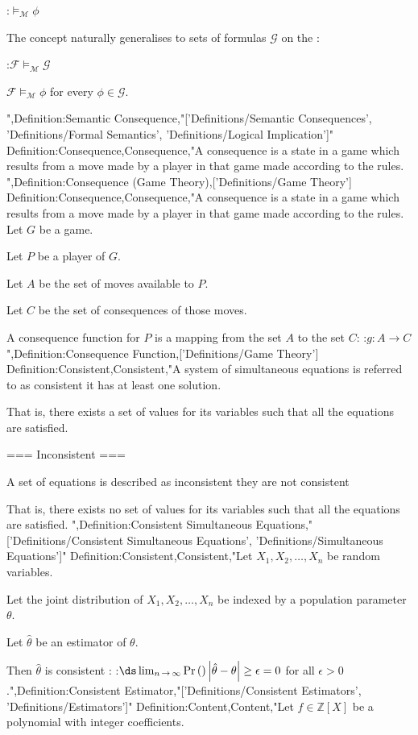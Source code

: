 :$\models_{\mathscr M} \phi$


The concept naturally generalises to sets of formulas $\mathcal G$ on the :

:$\mathcal F \models_{\mathscr M} \mathcal G$

 $\mathcal F \models_{\mathscr M} \phi$ for every $\phi \in \mathcal G$.





",Definition:Semantic Consequence,"['Definitions/Semantic Consequences', 'Definitions/Formal Semantics', 'Definitions/Logical Implication']"
Definition:Consequence,Consequence,"A consequence is a state in a game which results from a move made by a player in that game made according to the rules.
",Definition:Consequence (Game Theory),['Definitions/Game Theory']
Definition:Consequence,Consequence,"A consequence is a state in a game which results from a move made by a player in that game made according to the rules.
Let $G$ be a game.

Let $P$ be a player of $G$.

Let $A$ be the set of moves available to $P$.

Let $C$ be the set of consequences of those moves.


A consequence function for $P$ is a mapping from the set $A$ to the set $C$:
:$g: A \to C$
",Definition:Consequence Function,['Definitions/Game Theory']
Definition:Consistent,Consistent,"A system of simultaneous equations is referred to as consistent  it has at least one solution.

That is,  there exists a set of values for its variables such that all the equations are satisfied.


=== Inconsistent ===

A set of equations is described as inconsistent  they are not consistent

That is, there exists no set of values for its variables such that all the equations are satisfied.
",Definition:Consistent Simultaneous Equations,"['Definitions/Consistent Simultaneous Equations', 'Definitions/Simultaneous Equations']"
Definition:Consistent,Consistent,"Let $X_1, X_2, \ldots, X_n$ be random variables.

Let the joint distribution of $X_1, X_2, \ldots, X_n$ be indexed by a population parameter $\theta$.

Let $\hat \theta$ be an estimator of $\theta$.

Then $\hat \theta$ is consistent :
:$\ds \lim_{n \mathop \to \infty} \Pr \left(   \right){\left\lvert \hat \theta - \theta \right\rvert \ge \epsilon} = 0$
for all $\epsilon > 0$.",Definition:Consistent Estimator,"['Definitions/Consistent Estimators', 'Definitions/Estimators']"
Definition:Content,Content,"Let $f \in \mathbb Z \left[ X \right]$ be a polynomial with integer coefficients.

